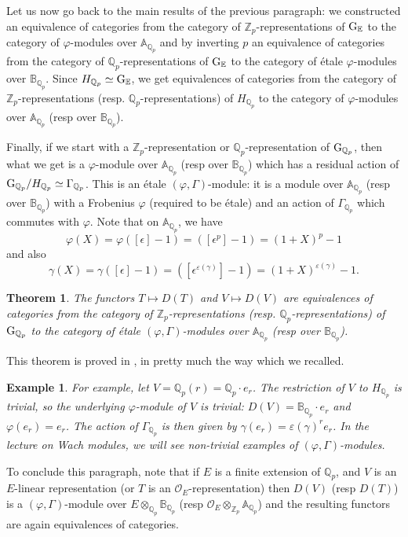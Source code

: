 \documentclass[11pt]{amsart}
\def\Z{{\mathbb Z}_p}
\def\Q{{\mathbb Q}_p}
\def\g{{\rm G}_{\Q}}
\def\O{{\mathcal O}_E}
\def\Qp{{\mathbb Q}_p}
\def\eps{\varepsilon}
\def\aa{\mathbb{A}}
\def\bb{\mathbb{B}}
\def\ee{\mathbb{E}}
\def\ge{{\rm G}_{\ee}}
\newtheorem{thm}[definit]{\bf{Theorem}}
\newtheorem{ex}[definit]{\bf{Example}}
\begin{document}
Let us now go back to the main results of the previous paragraph: we 
constructed an equivalence of categories from the category of  
$\Z$-representations of $\ge$ to the category of  
$\varphi$-modules over $\aa_{\Q}$ and by inverting $p$ 
an equivalence of categories from the category of  
$\Q$-representations of $\ge$ to the category of  
\'etale $\varphi$-modules over $\bb_{\Q}$. Since $H_{\Q} \simeq \ge$, 
we get equivalences of categories from the category of  
$\Z$-representations (resp. $\Q$-representations) of $H_{\Q}$ to the category of  
$\varphi$-modules over $\aa_{\Q}$ (resp over $\bb_{\Q}$).  
 
Finally, if we start with a $\Z$-representation or $\Q$-representation 
of $\g$, then what we get is a $\varphi$-module over $\aa_{\Q}$ (resp 
over $\bb_{\Q}$) which has a residual action of $\g/H_{\Q} \simeq 
\Gamma_{\Q}$. This is an \'etale $(\varphi,\Gamma)$-module: it is a  
module over $\aa_{\Q}$ (resp over $\bb_{\Q}$) with a Frobenius 
$\varphi$ (required to be \'etale) and an action of $\Gamma_{\Q}$ 
which commutes with $\varphi$. Note that on $\aa_{\Q}$, we have 
\[ \varphi(X)=\varphi([\epsilon]-1)= ([\epsilon^p]-1) 
= (1+X)^p-1 \] and also  
\[ \gamma(X)=\gamma([\epsilon]-1)=([\epsilon^{\eps(\gamma)}]-1) 
=(1+X)^{\eps(\gamma)}-1. \]  
 
\begin{thm}\label{pgmod} 
The functors $T \mapsto D(T)$ and $V \mapsto D(V)$ are  
equivalences of categories from the category of  
$\Z$-representations (resp. $\Q$-representations) of $\g$ to the 
category of \'etale $(\varphi,\Gamma)$-modules  over $\aa_{\Q}$ (resp 
over $\bb_{\Q}$).  
\end{thm} 
 
This theorem is proved in \cite{Fo91}, in pretty much the way 
which we recalled. 
 
\begin{ex} 
For example, let $V=\Qp(r)=\Qp \cdot e_r$. The restriction of $V$ to 
$H_{\Q}$ is trivial, so the underlying $\varphi$-module of $V$ is 
trivial: $D(V)=\bb_{\Q} \cdot e_r$ and $\varphi(e_r)=e_r$. The action of 
$\Gamma_{\Q}$ is then given by $\gamma(e_r) = \eps(\gamma)^r e_r$. In 
the lecture on Wach modules, we will see non-trivial examples of 
$(\varphi,\Gamma)$-modules.  
\end{ex} 
 
To conclude this paragraph, note that if $E$ is a finite extension of 
$\Qp$, and $V$ is an $E$-linear representation (or $T$ is an 
$\O$-representation) then $D(V)$ (resp $D(T)$) is a 
$(\varphi,\Gamma)$-module over $E \otimes_{\Q} \bb_{\Q}$ (resp $\O 
\otimes_{\Z} \aa_{\Q}$) and the resulting functors are again 
equivalences of categories.  
 
\end{document}
